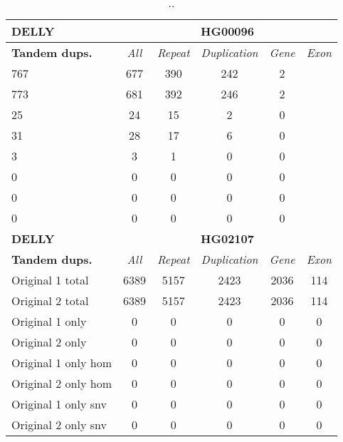 \begin{table}[htb]
\begin{center}
\begin{tabular}{|l|c||c|c|c|c|}
\hline
{\bf DELLY} & \multicolumn{5}{|c|}{\bf HG00096} \\
\hline
\cline{2-6}
{\bf Tandem dups.} & {\it All} & {\it Repeat} & {\it Duplication} & {\it Gene} & {\it Exon} \\
\hline
767 & 677 & 390 & 242 & 2\\ 
\hline
773 & 681 & 392 & 246 & 2\\ 
\hline
25 & 24 & 15 & 2 & 0\\ 
\hline
31 & 28 & 17 & 6 & 0\\ 
\hline
3 & 3 & 1 & 0 & 0\\ 
\hline
0 & 0 & 0 & 0 & 0\\ 
\hline
0 & 0 & 0 & 0 & 0\\ 
\hline
0 & 0 & 0 & 0 & 0\\ 
\hline
\hline
{\bf DELLY} & \multicolumn{5}{|c|}{\bf HG02107} \\
\hline
\cline{2-6}
{\bf Tandem dups.} & {\it All} & {\it Repeat} & {\it Duplication} & {\it Gene} & {\it Exon} \\
\hline
Original 1 total & 6389 & 5157 & 2423 & 2036 & 114\\ 
\hline
Original 2 total & 6389 & 5157 & 2423 & 2036 & 114\\ 
\hline
Original 1 only & 0 & 0 & 0 & 0 & 0\\ 
\hline
Original 2 only & 0 & 0 & 0 & 0 & 0\\ 
\hline
Original 1 only hom & 0 & 0 & 0 & 0 & 0\\ 
\hline
Original 2 only hom & 0 & 0 & 0 & 0 & 0\\ 
\hline
Original 1 only snv & 0 & 0 & 0 & 0 & 0\\ 
\hline
Original 2 only snv & 0 & 0 & 0 & 0 & 0\\ 
\hline
\end{tabular}
\end{center}
\caption{ .. }
\label{tab:orig-vs-shuf-delly-dups}
\end{table}
